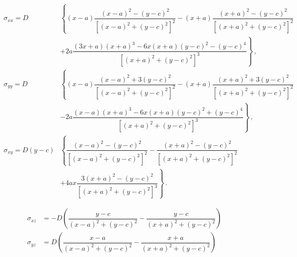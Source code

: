 \documentclass[11pt]{iopart}
\begin{document}
\begin{subequations}
    \begin{align}\label{e:imageStressAnalyticEdge2}
        \sigma_{xx} = D         & \left\{ (x - a) \dfrac{(x - a)^2 - (y - c)^2}{[(x - a)^2 + (y - c)^2]^2} -(x + a) \dfrac{(x + a)^2 - (y - c)^2}{[(x + a)^2 + (y - c)^2]^2} \right.     \\\nonumber
                                & \left. + 2 a \dfrac{(3 x + a) (x + a)^3 - 6 x (x + a) (y - c)^2 - (y - c)^4}{[(x + a)^2 + (y - c)^2]^3}\right\}\,,                                     \\
        \sigma_{yy} = D         & \left\{ (x - a) \dfrac{(x - a)^2 + 3 (y - c)^2}{[(x - a)^2 + (y - c)^2]^2} - (x + a) \dfrac{(x + a)^2 + 3 (y - c)^2}{[(x + a)^2 + (y - c)^2]^2}\right. \\\nonumber
                                & \left. - 2 a \dfrac{(x - a) (x + a)^3 - 6 x (x + a) (y - c)^2 + (y - c)^4}{[(x + a)^2 + (y - c)^2]^3}\right\}\,,                                       \\
        \sigma_{xy} = D (y - c) & \left\{\dfrac{(x - a)^2 - (y - c)^2}{[(x - a)^2 + (y - c)^2]^2} - \dfrac{(x + a)^2 - (y - c)^2}{[(x + a)^2 + (y - c)^2]^2} \right.                     \\\nonumber
                                & \left. + 4 a x \dfrac{3 (x + a)^2 - (y - c)^2}{[(x + a)^2 + (y - c)^2]^3}\right\}\,.
    \end{align}
\end{subequations}

\begin{subequations}
    \begin{align}
        \sigma_{xz} & = -D \left(\dfrac{y - c}{(x - a)^2 + (y - c)^2} - \dfrac{y - c}{(x + a)^2 + (y - c)^2}\right) \\
        \sigma_{yz} & = D \left(\dfrac{x - a}{(x - a)^2 + (y - c)^2} - \dfrac{x + a}{(x + a)^2 + (y - c)^2}\right)
    \end{align}
\end{subequations}
\end{document}

